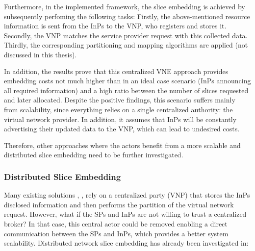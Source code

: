 Furthermore, in the \citep{dietrich2015multi} implemented framework, the slice embedding is achieved by subsequently perfoming the following tasks: Firstly, the above-mentioned resource information is sent from the InPs to the VNP, who registers and stores it. Secondly, the VNP matches the service provider request with this collected data. Thirdly, the corresponding partitioning and mapping algorithms are applied (not discussed in this thesis). 

In addition, the results prove that this centralized VNE approach provides embedding costs not much higher than in an ideal case scenario (InPs announcing all required information) and a high ratio between the number of slices requested and later allocated. Despite the positive findings, this scenario suffers mainly from scalability, since everything relies on a single centralized authority: the virtual network provider. In addition, it assumes that InPs will be constantly advertising their updated data to the VNP, which can lead to undesired costs.

Therefore, other approaches where the actors benefit from a more scalable and distributed slice embedding need to be further investigated.

\subsubsection{Distributed Slice Embedding}

Many existing solutions \citep{houidi2011virtual}, \citep{dietrich2015multi}, \citep{dietrich2017multi} rely on a centralized party (VNP) that stores the InPs disclosed information and then performs the partition of the virtual network request. However, what if the SPs and InPs are not willing to trust a centralized broker? In that case, this central actor could be removed enabling a direct communication between the SPs and InPs, which provides a better system scalability. Distributed network slice embedding has already been investigated in:

